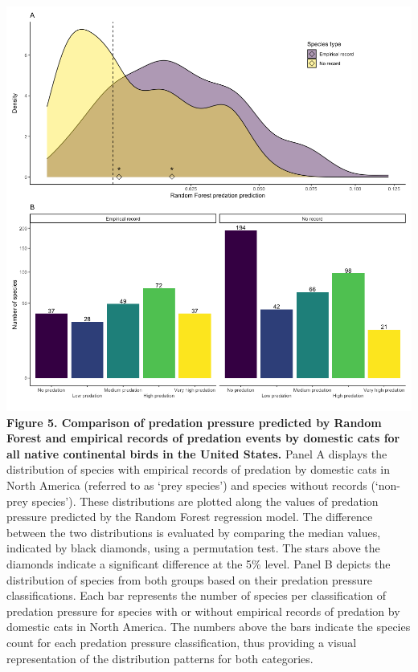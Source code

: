 \documentclass[
  super,
  review,
  3p]{elsarticle}
\begin{document}
\includegraphics{Figure5.png} \textbf{Figure 5. Comparison of predation
pressure predicted by Random Forest and empirical records of predation
events by domestic cats for all native continental birds in the United
States.} Panel A displays the distribution of species with empirical
records of predation by domestic cats in North America (referred to as
`prey species') and species without records (`non-prey species'). These
distributions are plotted along the values of predation pressure
predicted by the Random Forest regression model. The difference between
the two distributions is evaluated by comparing the median values,
indicated by black diamonds, using a permutation test. The stars above
the diamonds indicate a significant difference at the 5\% level. Panel B
depicts the distribution of species from both groups based on their
predation pressure classifications. Each bar represents the number of
species per classification of predation pressure for species with or
without empirical records of predation by domestic cats in North
America. The numbers above the bars indicate the species count for each
predation pressure classification, thus providing a visual
representation of the distribution patterns for both categories.
\end{document}
